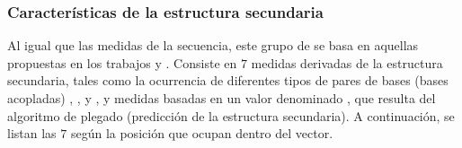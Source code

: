 %
%
\subsubsection{Características de la estructura secundaria}
%
Al igual que las medidas de la secuencia, este grupo de  se
basa en aquellas  propuestas en los trabajos 
\cite{ng} y  \cite{batuwita}.
Consiste en $7$ medidas derivadas de la estructura secundaria, tales
como la ocurrencia de diferentes tipos de pares de bases (bases
acopladas) , , y , y medidas basadas en un
valor denominado , que resulta del algoritmo
de plegado (predicción de la estructura secundaria).
A continuación, se listan las $7$  según la posición que
ocupan dentro del vector.
